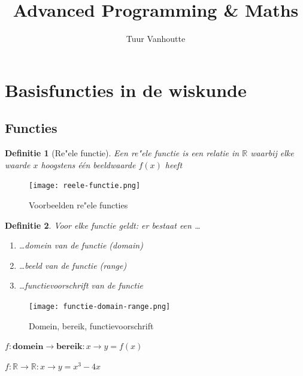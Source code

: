 \documentclass{article}
\newtheorem{theorem}{Definitie}[section]
\newenvironment{thmenum}
 {\begin{enumerate}[label=\upshape\bfseries(\roman*)]}
 {\end{enumerate}}
\begin{document}
\begin{titlepage}
    \author{Tuur Vanhoutte}
    \title{Advanced Programming \& Maths}
\end{titlepage}

\maketitle
\newpage
\tableofcontents
\newpage


\section{Basisfuncties in de wiskunde}

\subsection{Functies}

\begin{theorem}[Re"ele functie]
Een re"ele functie is een relatie in $\mathbb{R}$ waarbij elke waarde $x$ hoogstens één beeldwaarde $f(x)$ heeft
\end{theorem}

\begin{figure}[H]
    \centering
    \texttt{[image: reele-functie.png]}
    \caption{Voorbeelden re"ele functies}
\end{figure}

\begin{theorem}
Voor elke functie geldt: er bestaat een \dots
    \begin{thmenum}
        \item \dots domein van de functie (domain)
        \item \dots beeld van de functie (range)
        \item \dots functievoorschrift van de functie
    \end{thmenum}
\end{theorem}

\begin{figure}[H]
    \centering
    \texttt{[image: functie-domain-range.png]}
    \caption{Domein, bereik, functievoorschrift}
\end{figure}

$f: \mathbf{domein} \rightarrow \mathbf{bereik}: x \rightarrow y = f(x)$

$f: \mathbb{R} \rightarrow \mathbb{R} : x \rightarrow y = x^3 - 4x$
\end{document}
